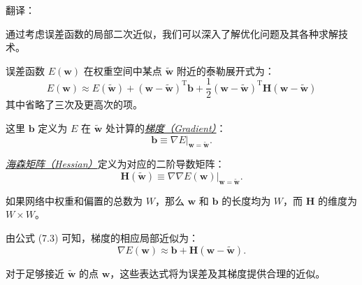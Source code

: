 \documentclass{article}
\begin{document}
{\color{red}
翻译：

通过考虑误差函数的局部二次近似，我们可以深入了解优化问题及其各种求解技术。

误差函数 $E(\mathbf{w})$ 在权重空间中某点 $\tilde{\mathbf{w}}$ 附近的泰勒展开式为：
\begin{equation}
E(\mathbf{w}) \approx E(\tilde{\mathbf{w}}) + (\mathbf{w} - \tilde{\mathbf{w}})^\mathrm{T} \mathbf{b} + \frac{1}{2} (\mathbf{w} - \tilde{\mathbf{w}})^\mathrm{T} \mathbf{H} (\mathbf{w} - \tilde{\mathbf{w}})
\tag{7.3}
\end{equation}
其中省略了三次及更高次的项。

这里 $\mathbf{b}$ 定义为 $E$ 在 $\tilde{\mathbf{w}}$ 处计算的\underline{\emph{梯度（Gradient）}}：
\begin{equation}
\mathbf{b} \equiv \left.\nabla E\right|_{\mathbf{w} = \tilde{\mathbf{w}}}.
\tag{7.4}
\end{equation}

\underline{\emph{海森矩阵（Hessian）}}定义为对应的二阶导数矩阵：
\begin{equation}
\mathbf{H}(\tilde{\mathbf{w}}) \equiv \left.\nabla\nabla E(\mathbf{w})\right|_{\mathbf{w} = \tilde{\mathbf{w}}}.
\tag{7.5}
\end{equation}

如果网络中权重和偏置的总数为 $W$，那么 $\mathbf{w}$ 和 $\mathbf{b}$ 的长度均为 $W$，而 $\mathbf{H}$ 的维度为 $W \times W$。

由公式 (7.3) 可知，梯度的相应局部近似为：
\begin{equation}
\nabla E(\mathbf{w}) \approx \mathbf{b} + \mathbf{H}(\mathbf{w} - \tilde{\mathbf{w}}).
\tag{7.6}
\end{equation}

对于足够接近 $\tilde{\mathbf{w}}$ 的点 $\mathbf{w}$，这些表达式将为误差及其梯度提供合理的近似。

}
\end{document}
